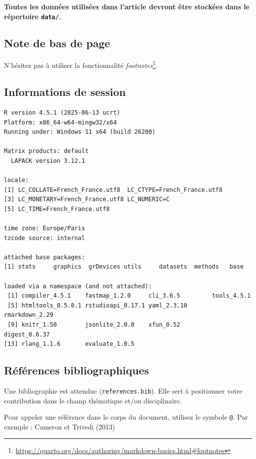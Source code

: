 \documentclass[
  french,
  11pt,
  a4paper,
]{article}
\begin{document}
\textbf{Toutes les données utilisées dans l'article devront être
stockées dans le répertoire \texttt{data/}.}

\subsection{Note de bas de page}\label{note-de-bas-de-page}

N'hésitez pas à utiliser la fonctionnalité \emph{footnotes}\footnote{\url{https://quarto.org/docs/authoring/markdown-basics.html\#footnotes}}.

\subsection{Informations de session}\label{informations-de-session}

\begin{verbatim}
R version 4.5.1 (2025-06-13 ucrt)
Platform: x86_64-w64-mingw32/x64
Running under: Windows 11 x64 (build 26200)

Matrix products: default
  LAPACK version 3.12.1

locale:
[1] LC_COLLATE=French_France.utf8  LC_CTYPE=French_France.utf8   
[3] LC_MONETARY=French_France.utf8 LC_NUMERIC=C                  
[5] LC_TIME=French_France.utf8    

time zone: Europe/Paris
tzcode source: internal

attached base packages:
[1] stats     graphics  grDevices utils     datasets  methods   base     

loaded via a namespace (and not attached):
 [1] compiler_4.5.1    fastmap_1.2.0     cli_3.6.5         tools_4.5.1      
 [5] htmltools_0.5.8.1 rstudioapi_0.17.1 yaml_2.3.10       rmarkdown_2.29   
 [9] knitr_1.50        jsonlite_2.0.0    xfun_0.52         digest_0.6.37    
[13] rlang_1.1.6       evaluate_1.0.5   
\end{verbatim}

\subsection{Références
bibliographiques}\label{ruxe9fuxe9rences-bibliographiques}

Une bibliographie est attendue (\texttt{references.bib}). Elle sert à
positionner votre contribution dans le champ thématique et/ou
disciplinaire.

Pour appeler une référence dans le corps du document, utilisez le
symbole \texttt{@}. Par exemple : Cameron et Trivedi (2013)
\end{document}
